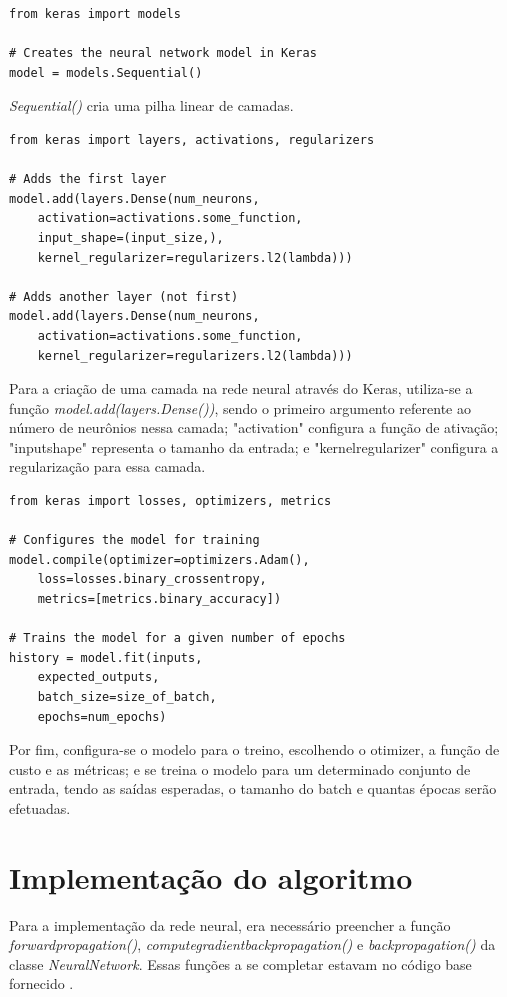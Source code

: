 \documentclass[conference]{IEEEtran}
\begin{document}
\begin{lstlisting}
from keras import models

# Creates the neural network model in Keras
model = models.Sequential()
\end{lstlisting}

\textit{Sequential()} cria uma pilha linear de camadas.

\begin{lstlisting}
from keras import layers, activations, regularizers

# Adds the first layer
model.add(layers.Dense(num_neurons,
	activation=activations.some_function,
	input_shape=(input_size,),
	kernel_regularizer=regularizers.l2(lambda)))

# Adds another layer (not first)
model.add(layers.Dense(num_neurons,
	activation=activations.some_function,
	kernel_regularizer=regularizers.l2(lambda)))
\end{lstlisting}

Para a criação de uma camada na rede neural através do Keras, utiliza-se a função \textit{model.add(layers.Dense())}, sendo o primeiro argumento referente ao número de neurônios nessa camada; "activation" configura a função de ativação; "input\underline{\space}shape" representa o tamanho da entrada; e "kernel\underline{\space}regularizer" configura a regularização para essa camada.

\begin{lstlisting}
from keras import losses, optimizers, metrics

# Configures the model for training
model.compile(optimizer=optimizers.Adam(),
	loss=losses.binary_crossentropy,
	metrics=[metrics.binary_accuracy])

# Trains the model for a given number of epochs
history = model.fit(inputs,
	expected_outputs,
	batch_size=size_of_batch,
	epochs=num_epochs)

\end{lstlisting}

Por fim, configura-se o modelo para o treino, escolhendo o otimizer, a função de custo e as métricas; e se treina o modelo para um determinado conjunto de entrada, tendo as saídas esperadas, o tamanho do batch e quantas épocas serão efetuadas.

\section{Implementação do algoritmo}
Para a implementação da rede neural, era necessário preencher a função \textit{forward\underline{\space}propagation()}, \textit{compute\underline{\space}gradient\underline{\space}back\underline{\space}propagation()} e \textit{back\underline{\space}propagation()} da classe \textit{NeuralNetwork}. Essas funções a se completar estavam no código base fornecido \cite{roteiro}.  
\end{document}
